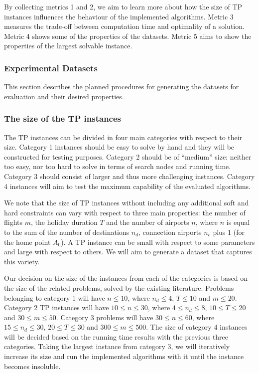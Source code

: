 \documentclass{mprop}
\theoremstyle{definition}
\begin{document}
By collecting metrics 1 and 2, we aim to learn more about how the size of TP instances influences the behaviour of the implemented algorithms. Metric 3 measures the trade-off between computation time and optimality of a solution. Metric 4 shows some of the properties of the datasets. Metric 5 aims to show the properties of the largest solvable instance.

\subsubsection{Experimental Datasets}
\label{sec:datasets}

This section describes the planned procedures for generating the datasets for evaluation and their desired properties.

\subsubsection*{The size of the TP instances}
The TP instances can be divided in four main categories with respect to their size. Category 1 instances should be easy to solve by hand and they will be constructed for testing purposes. Category 2 should be of ``medium'' size: neither too easy, nor too hard to solve in terms of search nodes and running time. Category 3 should consist of larger and thus more challenging instances. Category 4 instances will aim to test the maximum capability of the evaluated algorithms.

We note that the size of TP instances without including any additional soft and hard constraints can vary with respect to three main properties: the number of flights $m$, the holiday duration $T$ and the number of airports $n$, where $n$ is equal to the sum of the number of destinations $n_{d}$, connection airports $n_{c}$ plus 1 (for the home point $A_{0}$). A TP instance can be small with respect to some parameters and large with respect to others. We will aim to generate a dataset that captures this variety.%

Our decision on the size of the instances from each of the categories is based on  the size of the related problems, solved by the existing literature. Problems belonging to category 1 will have $n \leq 10$, where $n_{d} \leq 4$, $T \leq 10$ and $m \leq 20$. Category 2 TP instances will have $10 \leq n \leq 30$, where $4 \leq n_{d} \leq 8$, $10 \leq T \leq 20$ and $30 \leq m \leq 50$. Category 3 problems will have $30 \leq n \leq 60$, where $15 \leq n_{d} \leq 30$, $20 \leq T \leq 30$ and $300 \leq m \leq 500$. The size of category 4 instances will be decided based on the running time results with the previous three categories. Taking the largest instance from category 3, we will iteratively increase its size and run the implemented algorithms with it until the instance becomes insoluble.
\end{document}
